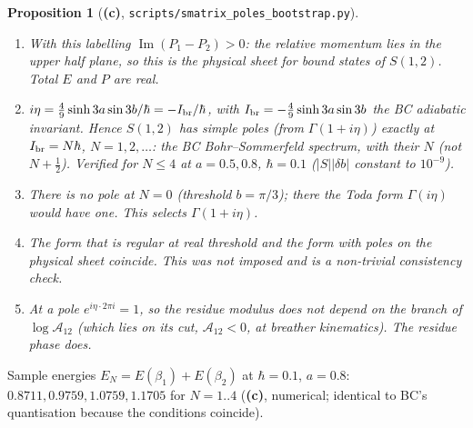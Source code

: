 \documentclass[11pt,a4paper]{article}
\newcommand{\Lc}{\textsf{\textbf{(c)}}}
\newcommand{\script}[1]{\texttt{scripts/#1}}
\newtheorem{proposition}{Proposition}[section]
\theoremstyle{remark}\newtheorem{remark}[proposition]{Remark}
\newcommand{\cA}{\mathcal A}
\begin{document}
\begin{proposition}[\Lc, \script{smatrix\_poles\_bootstrap.py}]\label{prop:poles}
\begin{enumerate}
\item With this labelling $\operatorname{Im}(P_1-P_2)>0$: the relative momentum lies in the upper half plane, so this is the physical sheet for bound states of $S(1,2)$. Total $E$ and $P$ are real.
\item $i\eta=\tfrac49\sinh3a\sin3b/\hbar=-I_{\rm br}/\hbar$, with $I_{\rm br}=-\tfrac49\sinh3a\sin3b$ the BC adiabatic invariant. Hence $S(1,2)$ has simple poles (from $\Gamma(1+i\eta)$) \emph{exactly} at $I_{\rm br}=N\hbar$, $N=1,2,\ldots$: the BC Bohr--Sommerfeld spectrum, with their $N$ (not $N+\tfrac12$). Verified for $N\le4$ at $a=0.5,0.8$, $\hbar=0.1$ ($|S||\delta b|$ constant to $10^{-9}$).
\item There is no pole at $N=0$ (threshold $b=\pi/3$); there the Toda form $\Gamma(i\eta)$ would have one. This selects $\Gamma(1+i\eta)$.
\item The form that is regular at real threshold and the form with poles on the physical sheet coincide. This was not imposed and is a non-trivial consistency check.
\item At a pole $e^{i\eta\cdot2\pi i}=1$, so the residue modulus does not depend on the branch of $\log\cA_{12}$ (which lies on its cut, $\cA_{12}<0$, at breather kinematics). The residue phase does.
\end{enumerate}
\end{proposition}

Sample energies $E_N=E(\beta_1)+E(\beta_2)$ at $\hbar=0.1$, $a=0.8$: $0.8711, 0.9759, 1.0759, 1.1705$ for $N=1..4$ (\Lc, numerical; identical to BC's quantisation because the conditions coincide).
\end{document}
